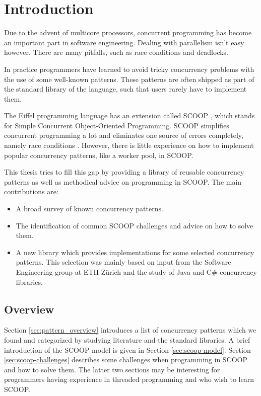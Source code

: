 \documentclass[a4paper,10pt,titlepage]{article}
\begin{document}
\section{Introduction}
\label{sec:introduction}


Due to the advent of multicore processors, concurrent programming has become an important part in software engineering.
Dealing with parallelism isn't easy however.
There are many pitfalls, such as race conditions and deadlocks.

In practice programmers have learned to avoid tricky concurrency problems with the use of some well-known patterns.
These patterns are often shipped as part of the standard library of the language, such that users rarely have to implement them.

The Eiffel programming language \cite{web:ecma-eiffel}\cite{book:touchofclass} has an extension called SCOOP \cite{Nienaltowski07}\cite{web:scoop},
which stands for Simple Concurrent Object-Oriented Programming.
SCOOP simplifies concurrent programming a lot and eliminates one source of errors completely, namely race conditions \cite{Nienaltowski07}.
However, there is little experience on how to implement popular concurrency patterns, like a worker pool, in SCOOP.

This thesis tries to fill this gap by providing a library of reusable concurrency patterns as well as methodical advice on programming in SCOOP.
The main contributions are:
\begin{itemize}
 \item A broad survey of known concurrency patterns.
 \item The identification of common SCOOP challenges and advice on how to solve them.
 \item A new library which provides implementations for some selected concurrency patterns.
 This selection was mainly based on input from the Software Engineering group at ETH Zürich and the study of Java \cite{web:java-concurrency} and C\# \cite{web:ms-tpl} concurrency libraries.
\end{itemize}

\subsection{Overview}

Section \ref{sec:pattern_overview} introduces a list of concurrency patterns which we found and categorized by studying literature and the standard libraries.
A brief introduction of the SCOOP model is given in Section \ref{sec:scoop-model}.
Section \ref{sec:scoop-challenges} describes some challenges when programming in SCOOP and how to solve them.
The latter two sections may be interesting for programmers having experience in threaded programming and who wish to learn SCOOP.
\end{document}
